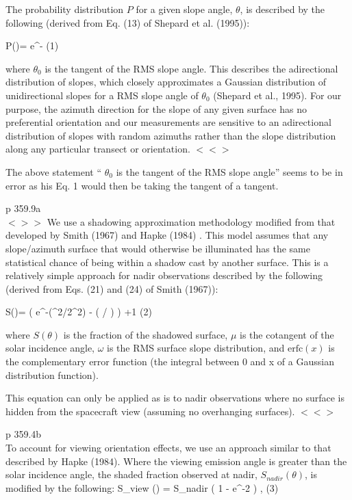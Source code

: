 \documentclass{article}
\newcommand{\erfc}{\mathrm{erfc}}  %
\newcommand{\qeq}{\hspace{25.mm}} %
\newcommand{\bq}{$ < \! > \!   \! >$ } %
\newcommand{\eq}{ $< \! \! < \! > $ } %
\begin{document}
The probability distribution $P$ for a given slope angle, $\theta$, is described
by the following (derived from Eq. (13) of Shepard et al. (1995)):

\qb P(\theta)= \cdot e^{- }  \qeq (1) \qe

where $\theta_0$ is the tangent of the RMS slope angle. This describes the
adirectional distribution of slopes, which closely approximates a
Gaussian distribution of unidirectional slopes for a RMS slope angle
of $\theta_0$ (Shepard et al., 1995). For our purpose, the azimuth direction
for the slope of any given surface has no preferential orientation
and our measurements are sensitive to an adirectional distribution
of slopes with random azimuths rather than the slope distribution
along any particular transect or orientation. \eq

The above statement `` $\theta_0$ is the tangent of the RMS slope angle'' seems to be in error as his Eq. 1 would then be taking the tangent of a tangent.

p 359.9a  \\ \bq 
We use a shadowing approximation methodology modified from that developed by
Smith (1967) and Hapke (1984) . This model assumes that any slope/azimuth
surface that would otherwise be illuminated has the same statistical chance of
being within a shadow cast by another surface. This is a relatively simple
approach for nadir observations described by the following (derived from
Eqs. (21) and (24) of Smith (1967)):

\qb S(\theta)=\frac{1-\frac{1}{2}  \erfc \left( \mu / \sqrt{2} \omega \right) }
{ \left(  \cdot \frac{\omega}{\mu} e^{-(\mu^2/2\omega^2)}
 - \erfc \left( \mu /  \omega \right) \right) +1 } \qeq (2) \qe

where $S(\theta)$ is the fraction of the shadowed surface, $\mu$ is the
cotangent of the solar incidence angle, $\omega$ is the RMS surface slope
distribution, and $\erfc(x)$ is the complementary error function (the integral
between 0 and x of a Gaussian distribution function).

This equation can only be applied as is to nadir observations where no surface
is hidden from the spacecraft view (assuming no overhanging surfaces). \eq



p 359.4b \\ 
 To account for viewing orientation effects, we use an approach similar to that
 described by Hapke (1984). Where the viewing emission angle is greater than
 the solar incidence angle, the shaded fraction observed at nadir,
$ S_{nadir} (\theta)$, is modified by the following:
\qb S_{view} (\theta) = S_{nadir} \cdot \left( 1 - e^{-2\tan {} } \right) , \qeq (3) \qe
\end{document}
